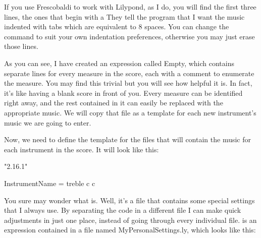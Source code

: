 \documentclass[../../LilyPond-Tutorials]{subfiles}
\begin{document}
If you use Frescobaldi to work with Lilypond, as I do, you will find the first three lines, the ones that begin with a %
They tell the program that I want the music indented with tabs which are equivalent to 8 spaces.
You can change the command to suit your own indentation preferences, otherwise you may just erase those lines.


As you can see, I have created an expression called Empty, which contains separate lines for every measure in the score, each with a comment to enumerate the measure. 
You may find this trivial but you will see how helpful it is.
In fact, it's like having a blank score in front of you.
Every measure can be identified right away, and the rest contained in it can easily be replaced with the appropriate music.
We will copy that file as a template for each new instrument's music we are going to enter.


Now, we need to define the template for the files that will contain the music for each instrument in the score.
It will look like this:

\begin{lilypondcode}
\version "2.16.1"


InstrumentName = {
       \clef treble %
       \key c \major
       \relative c {
              \PersonalSettings
       }
}
\end{lilypondcode}


You sure may wonder what  is.
Well, it's a file  that contains some special settings that I always use.
By separating the code in a different file I can make quick adjustments in just one place, instead of going through every individual file.
 is an expression contained in a file named MyPersonalSettings.ly, which looks like this:
\end{document}
